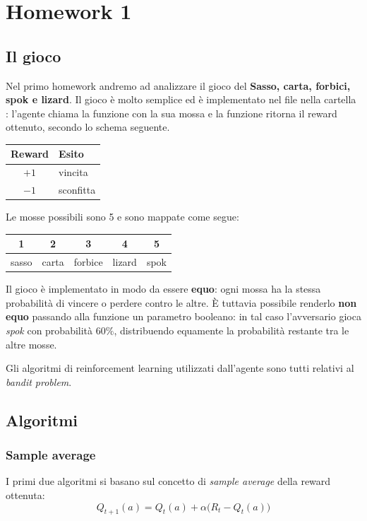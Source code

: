 \section{Homework 1}

\subsection{Il gioco}
Nel primo homework andremo ad analizzare il gioco del \textbf{Sasso, carta, forbici, spok e lizard}. Il gioco è molto semplice ed è implementato nel file  nella cartella : l'agente chiama la funzione  con la sua mossa e la funzione ritorna il reward ottenuto, secondo lo schema seguente.

\begin{center}
\begin{tabular}{cl}
\toprule
\textbf{Reward} & \textbf{Esito} \\
\midrule
$+1$ & vincita \\
$-1$ & sconfitta \\
\bottomrule
\end{tabular}
\end{center}

Le mosse possibili sono 5 e sono mappate come segue:

\begin{center}
\begin{tabular}{ccccc}
\toprule
1 & 2 & 3 & 4 & 5 \\
\midrule
sasso & carta & forbice & lizard & spok \\
\bottomrule
\end{tabular}
\end{center}


Il gioco è implementato in modo da essere \textbf{equo}: ogni mossa ha la stessa probabilità di vincere o perdere contro le altre. È tuttavia possibile renderlo \textbf{non equo} passando alla funzione  un parametro booleano: in tal caso l'avversario gioca \emph{spok} con probabilità $60\%$, distribuendo equamente la probabilità restante tra le altre mosse.


Gli algoritmi di reinforcement learning utilizzati dall'agente sono tutti relativi al \emph{bandit problem}.

\subsection{Algoritmi}

\subsubsection{Sample average}
I primi due algoritmi si basano sul concetto di \emph{sample average} della reward ottenuta:
\[
Q_{t+1}(a) = Q_t(a) + \alpha\big(R_t - Q_t(a)\big)
\]

